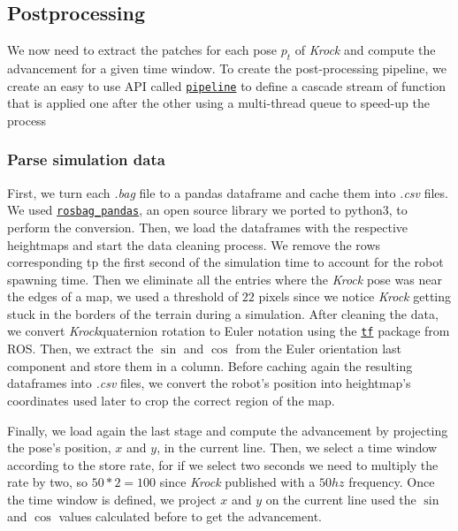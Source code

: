 \documentclass[../document.tex]{subfiles}
\begin{document}
\subsection{Postprocessing}
We now need to extract the patches for each pose $p_t$ of \emph{Krock} and compute the advancement for a given time window. To create the post-processing pipeline, we create an easy to use API called \href{https://github.com/FrancescoSaverioZuppichini/Master-Thesis/tree/master/core/utilities/pipeline}{\texttt{pipeline}} to define a cascade stream of function that is applied one after the other using a multi-thread queue to speed-up the process
\subsubsection{Parse simulation data}
First, we turn each \emph{.bag} file to a pandas dataframe and cache them into \emph{.csv} files. We used \href{https://github.com/aktaylor08/RosbagPandas}{\texttt{rosbag\_pandas}}, an open source library we ported to python3, to perform the conversion.
Then, we load the dataframes with the respective heightmaps and start the data cleaning process. We remove the rows corresponding tp the first second of the simulation time to account for the robot spawning time. Then we eliminate all the entries where the \emph{Krock} pose was near the edges of a map, we used a threshold of $22$ pixels since we notice  \emph{Krock} getting stuck in the borders of the terrain during a simulation. 
After cleaning the data, we convert \emph{Krock}quaternion rotation to Euler notation using the \href{https://duckduckgo.com/?q=ros+tf&atb=v154-1__&ia=web}{\texttt{tf}} package from ROS. Then, we extract the $\sin$ and $\cos$ from the Euler orientation last component and store them in a column.
Before caching again the resulting dataframes into \emph{.csv} files, we convert the robot's position into heightmap's coordinates used later to crop the correct region of the map.

Finally, we load again the last stage and compute the advancement by projecting the pose's position, $x$ and $y$, in the current line. Then, we select a time window according to the store rate, for if we select two seconds we need to multiply the rate by two, so $50*2=100$ since \emph{Krock} published with a $50hz$ frequency. Once the time window is defined, we project $x$ and $y$ on the current line used the $\sin$ and $\cos$ values calculated before to get the advancement.
\end{document}
